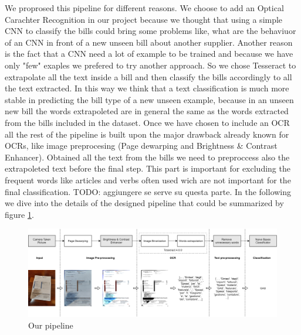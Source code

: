 \documentclass[10pt,twocolumn,letterpaper]{article}
\begin{document}
We proprosed this pipeline for different reasons. We choose to add an Optical Carachter Recognition in our project because we thought that using a simple CNN to classify the bills could bring some problems like, what are the behaviuor of an CNN in front of a new unseen bill about another supplier. Another reason is the fact that a CNN need a lot of example to be trained and because we have only "few" exaples we prefered to try another approach. So we chose Tesseract to extrapolate all the text inside a bill and then classify the bills accordingly to all the text extracted. In this way we think that a text classification is much more stable in predicting the bill type of a new unseen example, because in an unseen new bill the words extrapoleted are in general the same as the words extracted from the bills included in the dataset. Once we have chosen to include an OCR all the rest of the pipeline is built upon the major drawback already known for OCRs, like image preprocesing (Page dewarping and Brightness \& Contrast Enhancer). Obtained all the text from the bills we need to preproccess also the extrapoleted text before the final step. This part is important for excluding the frequent words like articles and 
verbs often used wich are not important for the final classification. TODO: aggiungere se serve su questa parte. In the following we dive into the details of the designed pipeline that could be summarized by figure \ref{fig:pipeline}.

\begin{figure}[h]
  \centering
  \includegraphics[width=1.0\textwidth]{images/pipeline.png}
  \caption{Our pipeline}
  \label{fig:pipeline}
\end{figure}
\end{document}
